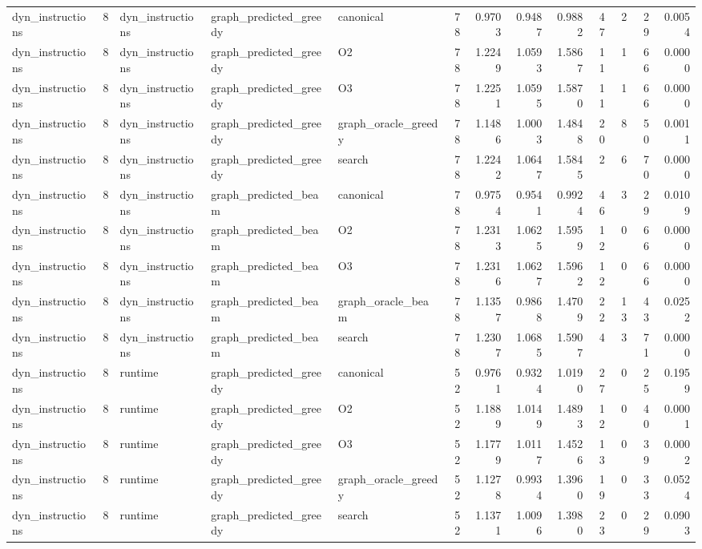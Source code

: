 \begin{table}[t]
\begin{tabular}{lrlllrrrrrrrr}
dyn\_instructions & 8 & dyn\_instructions & graph\_predicted\_greedy & canonical & 78 & 0.9703 & 0.9487 & 0.9882 & 47 & 2 & 29 & 0.0054 \\
dyn\_instructions & 8 & dyn\_instructions & graph\_predicted\_greedy & O2 & 78 & 1.2249 & 1.0593 & 1.5867 & 11 & 1 & 66 & 0.0000 \\
dyn\_instructions & 8 & dyn\_instructions & graph\_predicted\_greedy & O3 & 78 & 1.2251 & 1.0595 & 1.5870 & 11 & 1 & 66 & 0.0000 \\
dyn\_instructions & 8 & dyn\_instructions & graph\_predicted\_greedy & graph\_oracle\_greedy & 78 & 1.1486 & 1.0003 & 1.4848 & 20 & 8 & 50 & 0.0011 \\
dyn\_instructions & 8 & dyn\_instructions & graph\_predicted\_greedy & search & 78 & 1.2242 & 1.0647 & 1.5845 & 2 & 6 & 70 & 0.0000 \\
dyn\_instructions & 8 & dyn\_instructions & graph\_predicted\_beam & canonical & 78 & 0.9754 & 0.9541 & 0.9924 & 46 & 3 & 29 & 0.0109 \\
dyn\_instructions & 8 & dyn\_instructions & graph\_predicted\_beam & O2 & 78 & 1.2313 & 1.0625 & 1.5959 & 12 & 0 & 66 & 0.0000 \\
dyn\_instructions & 8 & dyn\_instructions & graph\_predicted\_beam & O3 & 78 & 1.2316 & 1.0627 & 1.5962 & 12 & 0 & 66 & 0.0000 \\
dyn\_instructions & 8 & dyn\_instructions & graph\_predicted\_beam & graph\_oracle\_beam & 78 & 1.1357 & 0.9868 & 1.4709 & 22 & 13 & 43 & 0.0252 \\
dyn\_instructions & 8 & dyn\_instructions & graph\_predicted\_beam & search & 78 & 1.2307 & 1.0685 & 1.5907 & 4 & 3 & 71 & 0.0000 \\
dyn\_instructions & 8 & runtime & graph\_predicted\_greedy & canonical & 52 & 0.9761 & 0.9324 & 1.0190 & 27 & 0 & 25 & 0.1959 \\
dyn\_instructions & 8 & runtime & graph\_predicted\_greedy & O2 & 52 & 1.1889 & 1.0149 & 1.4893 & 12 & 0 & 40 & 0.0001 \\
dyn\_instructions & 8 & runtime & graph\_predicted\_greedy & O3 & 52 & 1.1779 & 1.0117 & 1.4526 & 13 & 0 & 39 & 0.0002 \\
dyn\_instructions & 8 & runtime & graph\_predicted\_greedy & graph\_oracle\_greedy & 52 & 1.1278 & 0.9934 & 1.3960 & 19 & 0 & 33 & 0.0524 \\
dyn\_instructions & 8 & runtime & graph\_predicted\_greedy & search & 52 & 1.1371 & 1.0096 & 1.3980 & 23 & 0 & 29 & 0.0903 \\

\end{tabular}
\end{table}
